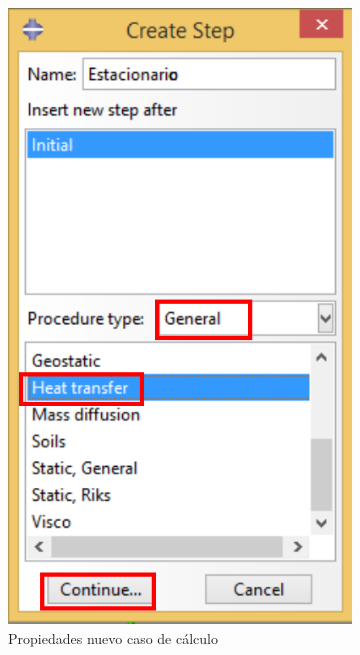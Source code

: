 \begin{figure}
\begin{subfigure}[!h]{0.39\textwidth}
      \includegraphics[width=\textwidth]{./body/images/step02.pdf}
      \caption{Propiedades nuevo caso de cálculo}
      \label{step02}
    \end{subfigure}%
    ~ %
    \begin{subfigure}[!h]{0.39\textwidth}

\end{subfigure}
\end{figure}
